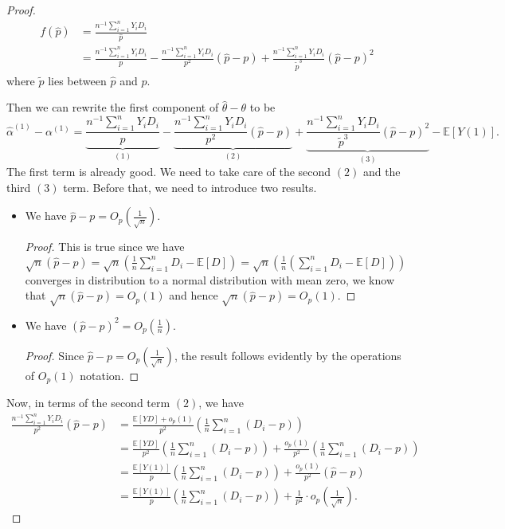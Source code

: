 \documentclass[11pt,a4paper]{amsart}
\theoremstyle{plain}
\theoremstyle{definition}
\begin{document}
\begin{proof}
\[\begin{aligned}
			f(\hat{p}) 
			&= \frac{n^{-1}\sum_{i = 1}^{n}Y_{i}D_{i}}{\hat{p}} \\
			&= \frac{n^{-1}\sum_{i = 1}^{n}Y_{i}D_{i}}{p} - \frac{n^{-1}\sum_{i = 1}^{n}Y_{i}D_{i}}{p^{2}}(\hat{p} - p) + \frac{n^{-1}\sum_{i = 1}^{n}Y_{i}D_{i}}{\tilde{p}^{3}} (\hat{p} - p)^{2}	
		\end{aligned}	\] 
		where $\tilde{p}$ lies between $\hat{p}$ and $p$.\par 
		Then we can rewrite the first component of $\hat{\theta} - \theta$ to be
		\begin{equation}\label{terms 1,2 and 3, asym. RCT}
		\hat{\alpha}^{(1)} - \alpha^{(1)} = \underbrace{\frac{n^{-1}\sum_{i = 1}^{n}Y_{i}D_{i}}{p}}_{(1)} - \underbrace{\frac{n^{-1}\sum_{i = 1}^{n}Y_{i}D_{i}}{p^{2}}(\hat{p} - p)}_{(2)} + \underbrace{\frac{n^{-1}\sum_{i = 1}^{n}Y_{i}D_{i}}{\tilde{p}^{3}} (\hat{p} - p)^{2}}_{(3)} - \mathbb{E}[Y(1)].
		\end{equation}
	 The first term is already good. We need to take care of the second $(2)$ and the third $(3)$ term. Before that, we need to introduce two results.
	 \begin{itemize}
	 			\item We have $\hat{p} - p = O_{p}(\frac{1}{\sqrt{n}})$.
	 	\begin{proof}
	 		This is true since we have $\sqrt{n}(\hat{p} - p) = \sqrt{n}(\frac{1}{n}\sum_{i = 1}^{n}D_{i}-\mathbb{E}[D]) =  \sqrt{n}(\frac{1}{n}(\sum_{i = 1}^{n}D_{i}-\mathbb{E}[D])) $ converges in distribution to a normal distribution with mean zero, we know that $\sqrt{n}(\hat{p} - p) = O_{p}(1)$ and hence $\sqrt{n}(\hat{p} - p) = O_{p}(1)$.
	 	\end{proof}
	 	\item We have $(\hat{p} - p)^{2} = O_{p}(\frac{1}{n})$.
	 	\begin{proof}
	 		Since $\hat{p} - p = O_{p}(\frac{1}{\sqrt{n}})$, the result follows evidently by the operations of $O_{p}(1)$ notation.
	 	\end{proof}
	 \end{itemize}
 	
	 Now, in terms of the second term $(2)$, we have 
	 \begin{equation}
	 	\begin{aligned}
		 		\frac{n^{-1}\sum_{i = 1}^{n}Y_{i}D_{i}}{p^{2}}(\hat{p} - p) &= 	\frac{\mathbb{E}[YD]+o_{p}(1)}{p^{2}}(\frac{1}{n}\sum_{i = 1}^{n} (D_{i} - p)) \\
		 		&= \frac{\mathbb{E}[YD]}{p^{2}}(\frac{1}{n}\sum_{i = 1}^{n} (D_{i} - p)) +  \frac{o_{p}(1)}{p^{2}}(\frac{1}{n}\sum_{i = 1}^{n} (D_{i} - p)) \\
		 		&= \frac{\mathbb{E}[Y(1)]}{p}(\frac{1}{n}\sum_{i = 1}^{n} (D_{i} - p)) +  \frac{o_{p}(1)}{p^{2}}(\hat{p} - p)\\
		 		&=  \frac{\mathbb{E}[Y(1)]}{p}(\frac{1}{n}\sum_{i = 1}^{n} (D_{i} - p)) + 
		 		\frac{1}{p^{2}} \cdot o_{p}(\frac{1}{\sqrt{n}}).
	 	\end{aligned}
	 \end{equation}
	 

\end{proof}
\end{document}

